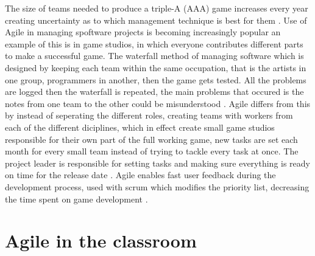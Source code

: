 \documentclass{scrartcl}
\begin{document}
The size of teams needed to produce a triple-A (AAA) game increases every year creating uncertainty as to which management technique is best for them \cite{mateos2008adopting} \cite{mcguire2006paper}. Use of Agile in managing spoftware projects is becoming increasingly popular\cite{one2012state} an example of this is in game studios, in which everyone contributes different parts to make a successful game. The waterfall method of managing software which is designed by keeping each team within the same occupation, that is the artists in one group, programmers in another, then the game gets tested. All the problems are logged then the waterfall is repeated, the main problems that occured is the notes from one team to the other could be misunderstood \cite{snapp2008accidental}. Agile differs from this by instead of seperating the different roles, creating teams with workers from each of the different diciplines, which in effect create small game studios responsible for their own part of the full working game, new tasks are set each month for every small team instead of trying to tackle every task at once. The project leader is responsible for setting tasks and making sure everything is ready on time for the release date \cite{Crowley2016GDC}. Agile enables fast user feedback during the development process, used with scrum which modifies the priority list, decreasing the time spent on game development \cite{mateos2008adopting}.

\section{Agile in the classroom}





\end{document}
